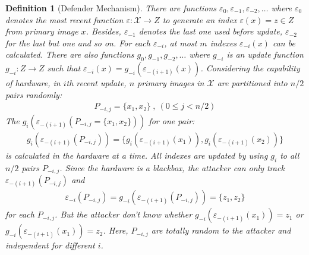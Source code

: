 \documentclass[10pt, conference, compsocconf]{IEEEtran}
\newtheorem{mydef}{Definition}
\begin{document}
        \begin{mydef}[Defender Mechanism]
            There are functions $\varepsilon_0, \varepsilon_{-1}, \varepsilon_{-2}, \ldots$ where
            $\varepsilon_0$ denotes the most recent function $\varepsilon: \mathcal{X} \rightarrow Z$
            to generate an index $\varepsilon(x) = z \in Z$ from primary image $x$.
            Besides, $\varepsilon_{-1}$ denotes the last one used before update, $\varepsilon_{-2}$
            for the last but one and so on.
            For each $\varepsilon_{-i}$, at most $m$ indexes $\varepsilon_{-i}(x)$ can be calculated.
            There are also functions $g_0, g_{-1}, g_{-2}, \ldots$ where
            $g_{-i}$ is an update function $g_{-i}: Z \rightarrow Z$ such that
            $\varepsilon_{-i}(x) = g_{-i}\left(\varepsilon_{-(i+1)}(x) \right)$. Considering the capability of hardware,
            in $i$th recent update,
            $n$ primary images in $\mathcal X$ are partitioned into $n/2$ pairs randomly:
            \begin{align*}
                P_{-i, j} = \{x_1, x_2\} ~, ~ (0 \leq j < n/2)
            \end{align*}
            The $g_i\left(\varepsilon_{-(i+1)}(P_{-i, j} = \{x_1, x_2\})\right)$ for one pair:
            \begin{align*}
                g_i\left(\varepsilon_{-(i+1)}(P_{-i, j})\right) = \{ g_i\left(\varepsilon_{-(i+1)}(x_1)\right),
                    g_i\left(\varepsilon_{-(i+1)}(x_2)\right) \}
            \end{align*}
            is
            calculated in the hardware at a time. All indexes are updated by using
            $g_i$ to all $n/2$ pairs $P_{-i, j}$.
            Since the hardware is a blackbox, the attacker can only track
            $\varepsilon_{-(i+1)}(P_{-i, j})$ and
            \begin{align*}
                \varepsilon_{-i}(P_{-i, j}) = g_{-i}\left( \varepsilon_{-(i+1)}(P_{-i, j}) \right) = \{z_1, z_2\}
            \end{align*}
            for each $P_{-i, j}$.
            But the attacker don't know whether $g_{-i}(\varepsilon_{-(i+1)}(x_1)) = z_1$ or
            $g_{-i}(\varepsilon_{-(i+1)}(x_1)) = z_2$.
            Here, $P_{-i, j}$ are totally random
            to the attacker and independent for different $i$.
        \end{mydef}
\end{document}
